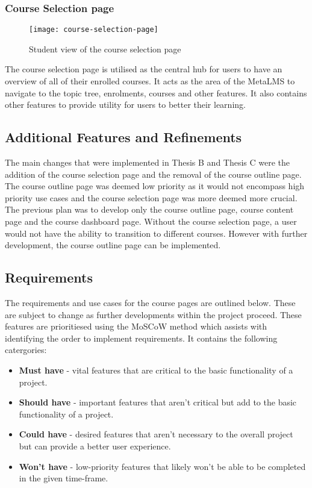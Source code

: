 \subsubsection{Course Selection page}
\begin{figure}[h]
    \centering
    \texttt{[image: course-selection-page]}
    \caption{Student view of the course selection page}
\end{figure}
The course selection page is utilised as the central hub for users to have an overview of all of their enrolled courses.
It acts as the area of the MetaLMS to navigate to the topic tree, enrolments, courses and other features.
It also contains other features to provide utility for users to better their learning.

\subsection{Additional Features and Refinements}
The main changes that were implemented in Thesis B and Thesis C were the addition of the course selection page and the removal of the course outline page.
The course outline page was deemed low priority as it would not encompass high priority use cases and the course selection page was more deemed more crucial.
The previous plan was to develop only the course outline page, course content page and the course dashboard page.
Without the course selection page, a user would not have the ability to transition to different courses.
However with further development, the course outline page can be implemented.

\subsection{Requirements}
The requirements and use cases for the course pages are outlined below. These are subject to change as further developments within the project proceed.
These features are prioritiesed using the MoSCoW method which assists with identifying the order to implement requirements.
It contains the following catergories:
\begin{itemize}
    \item \textbf{Must have} - vital features that are critical to the basic functionality of a project.
    \item \textbf{Should have} - important features that aren't critical but add to the basic functionality of a project.
    \item \textbf{Could have} - desired features that aren't necessary to the overall project but can provide a better user experience.
    \item \textbf{Won't have} - low-priority features that likely won't be able to be completed in the given time-frame.
\end{itemize}


